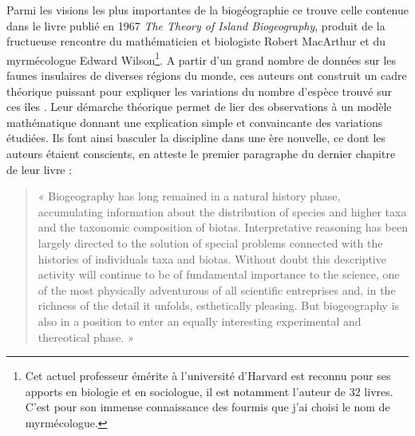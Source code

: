 Parmi les visions les plus importantes de la biogéographie ce trouve
celle contenue dans le livre publié en 1967 \emph{The Theory of Island
Biogeography}, produit de la fructueuse rencontre du mathématicien et
biologiste Robert MacArthur et du myrmécologue Edward Wilson\footnote{Cet
  actuel professeur émérite à l'université d'Harvard est reconnu pour
  ses apports en biologie et en sociologue, il est notamment l'auteur de
  32 livres. C'est pour son immense connaissance des fourmis que j'ai
  choisi le nom de myrmécologue.}. A partir d'un grand nombre de données
sur les faunes insulaires de diverses régions du monde, ces auteurs ont
construit un cadre théorique puissant pour expliquer les variations du
nombre d'espèce trouvé sur ces îles \citep{MacArthur1967}. Leur démarche
théorique permet de lier des observations à un modèle mathématique
donnant une explication simple et convaincante des variations étudiées.
Ils font ainsi basculer la discipline dans une ère nouvelle, ce dont les
auteurs étaient conscients, en atteste le premier paragraphe du dernier
chapitre de leur livre :

\begin{quote}
« Biogeography has long remained in a natural history phase,
accumulating information about the distribution of species and higher
taxa and the taxonomic composition of biotas. Interpretative reasoning
has been largely directed to the solution of special problems connected
with the histories of individuals taxa and biotas. Without doubt this
descriptive activity will continue to be of fundamental importance to
the science, one of the most physically adventurous of all scientific
entreprises and, in the richness of the detail it unfolds, esthetically
pleasing. But biogeography is also in a position to enter an equally
interesting experimental and thereotical phase. »
\end{quote}

